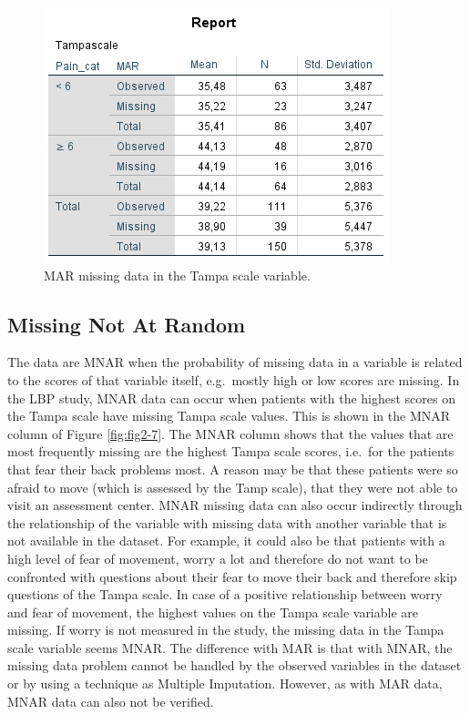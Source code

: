 \documentclass[]{book}
\begin{document}
\begin{figure}

{\centering \includegraphics[width=0.9\linewidth]{images/tab2.3} 

}

\caption{MAR missing data in the Tampa scale variable.}\label{fig:tab2-3}
\end{figure}

\subsection{Missing Not At Random}\label{missing-not-at-random}

The data are MNAR when the probability of missing data in a variable is
related to the scores of that variable itself, e.g.~mostly high or low
scores are missing. In the LBP study, MNAR data can occur when patients
with the highest scores on the Tampa scale have missing Tampa scale
values. This is shown in the MNAR column of Figure \ref{fig:fig2-7}. The
MNAR column shows that the values that are most frequently missing are
the highest Tampa scale scores, i.e.~for the patients that fear their
back problems most. A reason may be that these patients were so afraid
to move (which is assessed by the Tamp scale), that they were not able
to visit an assessment center. MNAR missing data can also occur
indirectly through the relationship of the variable with missing data
with another variable that is not available in the dataset. For example,
it could also be that patients with a high level of fear of movement,
worry a lot and therefore do not want to be confronted with questions
about their fear to move their back and therefore skip questions of the
Tampa scale. In case of a positive relationship between worry and fear
of movement, the highest values on the Tampa scale variable are missing.
If worry is not measured in the study, the missing data in the Tampa
scale variable seems MNAR. The difference with MAR is that with MNAR,
the missing data problem cannot be handled by the observed variables in
the dataset or by using a technique as Multiple Imputation. However, as
with MAR data, MNAR data can also not be verified.
\end{document}
